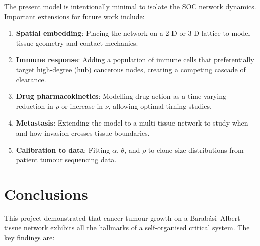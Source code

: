\documentclass[12pt,a4paper]{article}
\begin{document}
The present model is intentionally minimal to isolate the SOC network dynamics.
Important extensions for future work include:
\begin{enumerate}[leftmargin=1.5em]
  \item \textbf{Spatial embedding}: Placing the network on a 2-D or 3-D
        lattice to model tissue geometry and contact mechanics.
  \item \textbf{Immune response}: Adding a population of immune cells that
        preferentially target high-degree (hub) cancerous nodes, creating a
        competing cascade of clearance.
  \item \textbf{Drug pharmacokinetics}: Modelling drug action as a time-varying
        reduction in $\rho$ or increase in $\nu$, allowing optimal timing
        studies.
  \item \textbf{Metastasis}: Extending the model to a multi-tissue network to
        study when and how invasion crosses tissue boundaries.
  \item \textbf{Calibration to data}: Fitting $\alpha$, $\theta$, and $\rho$
        to clone-size distributions from patient tumour sequencing data.
\end{enumerate}

\section{Conclusions}

This project demonstrated that cancer tumour growth on a Barab\'{a}si--Albert
tissue network exhibits all the hallmarks of a self-organised critical system.
The key findings are:
\end{document}

